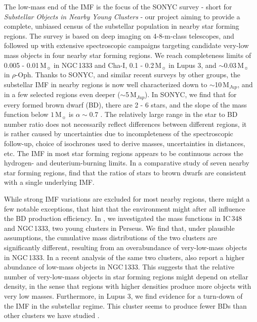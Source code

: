 \documentclass[a4paper,fleqn,usenatbib]{mnras}
\begin{document}
The low-mass end of the IMF is the focus of  
the SONYC survey - short for {\it Substellar Objects in Nearby Young Clusters} - our
project aiming to provide a complete, unbiased census of the substellar population
in nearby star forming regions. 
The survey is based on deep imaging on 4-8-m-class telescopes, and followed up with extensive spectroscopic campaigns targeting candidate very-low mass objects
in four nearby star forming regions. We reach completeness limits of 0.005 - 0.01\,M$_{\sun}$ in NGC\,1333 and Cha-I, 
0.1 - 0.2\,M$_{\sun}$ in Lupus 3, and $\sim$0.03\,M$_{\sun}$ in $\rho$-Oph. 
Thanks to SONYC, and similar recent surveys by other groups, the substellar IMF in nearby regions is now well characterized 
down to $\sim$10\,M$_{Jup}$, and in a few selected
regions even deeper ($\sim$5\,M$_{Jup}$). In SONYC, we find that for every formed brown dwarf (BD), there are 2 - 6 stars, and the slope
of the mass function below $1$\,M$_{\sun}$ is $\alpha\sim0.7$ \citep{scholz12b, scholz13, muzic15}. The relatively large range in the star to BD number ratio 
does not necessarily reflect differences between different regions, it is rather caused by 
uncertainties due to incompleteness of the spectroscopic follow-up, choice of isochrones
used to derive masses, uncertainties in distances, etc.
The IMF in most star forming regions appears to be continuous across the hydrogen- and deuterium-burning limits.
In a comparative study of seven nearby  star forming regions, \citet{andersen08} find that the ratios of stars
to brown dwarfs are consistent with a single underlying IMF. 

While strong IMF variations are excluded for most nearby regions, there might a few notable exceptions, that hint 
 that the environment might after all influence the BD production efficiency.
In \citet{scholz13}, we investigated 
the mass functions in IC\,348 and NGC\,1333, two young clusters in Perseus. We find that, under plausible assumptions, the cumulative mass distributions 
of the two clusters are significantly different, resulting from an overabundance of very-low-mass objects in NGC\,1333. 
In a recent analysis of the same two clusters, \citet{luhman16} also report a higher abundance of low-mass objects in NGC\,1333.
This  suggests that the relative number of very-low-mass objects in star forming regions might 
depend on stellar density, in the sense that regions with higher densities produce more objects with very low masses.  Furthermore, in Lupus 3, we find evidence 
for a turn-down of the IMF in the substellar regime. This cluster seems to produce fewer BDs than other 
clusters we have studied \citep{muzic15, comeron11}. 
\end{document}
